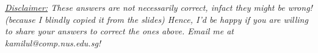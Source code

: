 \documentclass[10pt,a4paper,answers]{exam}
\makeatletter
\newcommand{\authoremail}{kamilul@comp.nus.edu.sg} %
\makeatother
\begin{document}
\begin{questions}

 \ifprintanswers \begin{small}\em \underline{Disclaimer:} These answers are not necessarily correct, infact they might be wrong! (because I blindly copied it from the slides) Hence, I'd be happy if you are willing to share your answers to correct the ones above. Email me at \authoremail!\end{small} \fi


\end{questions}
\end{document}

